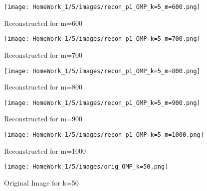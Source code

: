\documentclass{article}
\begin{document}
\begin{figure}[h!]
    \begin{minipage}{0.1\textwidth}
        \centering
        \texttt{[image: HomeWork\_1/5/images/recon\_p1\_OMP\_k=5\_m=600.png]}
        \caption{Reconstructed for m=600}
    \end{minipage}
    \hspace{0.5cm}
    \begin{minipage}{0.1\textwidth}
        \centering
        \texttt{[image: HomeWork\_1/5/images/recon\_p1\_OMP\_k=5\_m=700.png]}
        \caption{Reconstructed for m=700}
    \end{minipage}
    \hspace{0.5cm}
    \begin{minipage}{0.1\textwidth}
        \centering
        \texttt{[image: HomeWork\_1/5/images/recon\_p1\_OMP\_k=5\_m=800.png]}
        \caption{\small Reconstructed for m=800}
    \end{minipage}
    \hspace{0.5cm}
    \begin{minipage}{0.1\textwidth}
        \centering
        \texttt{[image: HomeWork\_1/5/images/recon\_p1\_OMP\_k=5\_m=900.png]}
        \caption{Reconstructed for m=900}
    \end{minipage}
    \hspace{0.5cm}
    \begin{minipage}{0.1\textwidth}
        \centering
        \texttt{[image: HomeWork\_1/5/images/recon\_p1\_OMP\_k=5\_m=1000.png]}
        \caption{Reconstructed for m=1000}
    \end{minipage}
\end{figure}

\begin{figure}[h!]
        \centering
        \texttt{[image: HomeWork\_1/5/images/orig\_OMP\_k=50.png]}
        \caption{Original Image for k=50}
\end{figure}
\end{document}
